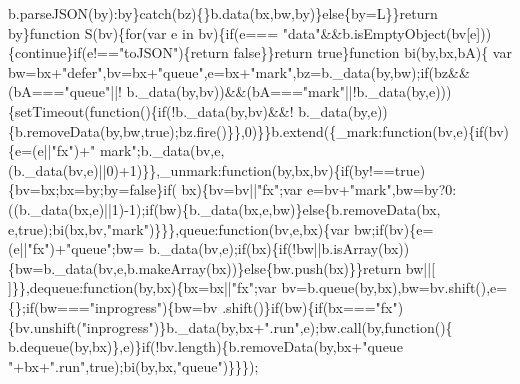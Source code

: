 \begin{DoxyCode}
      b.parseJSON(by):by\}catch(bz)\{\}b.data(bx,bw,by)\}\textcolor{keywordflow}{else}\{by=L\}\}\textcolor{keywordflow}{return} by\}\textcolor{keyword}{function} S(bv)\{\textcolor{keywordflow}{for}(var e in bv)\{\textcolor{keywordflow}{if}(e===\textcolor{stringliteral}{
      "data"}&&b.isEmptyObject(bv[e]))\{\textcolor{keywordflow}{continue}\}\textcolor{keywordflow}{if}(e!==\textcolor{stringliteral}{"toJSON"})\{\textcolor{keywordflow}{return} \textcolor{keyword}{false}\}\}\textcolor{keywordflow}{return} \textcolor{keyword}{true}\}\textcolor{keyword}{function} bi(by,bx,bA)\{
      var bw=bx+\textcolor{stringliteral}{"defer"},bv=bx+\textcolor{stringliteral}{"queue"},e=bx+\textcolor{stringliteral}{"mark"},bz=b.\_data(by,bw);\textcolor{keywordflow}{if}(bz&&(bA===\textcolor{stringliteral}{"queue"}||!
      b.\_data(by,bv))&&(bA===\textcolor{stringliteral}{"mark"}||!b.\_data(by,e)))\{setTimeout(\textcolor{keyword}{function}()\{\textcolor{keywordflow}{if}(!b.\_data(by,bv)&&!
      b.\_data(by,e))\{b.removeData(by,bw,\textcolor{keyword}{true});bz.fire()\}\},0)\}\}b.extend(\{\_mark:function(bv,e)\{if(bv)\{e=(e||\textcolor{stringliteral}{"fx"})+\textcolor{stringliteral}{"
      mark"};b.\_data(bv,e,(b.\_data(bv,e)||0)+1)\}\},\_unmark:\textcolor{keyword}{function}(by,bx,bv)\{if(by!==true)\{bv=bx;bx=by;by=false\}\textcolor{keywordflow}{if}(
      bx)\{bv=bv||\textcolor{stringliteral}{"fx"};var e=bv+\textcolor{stringliteral}{"mark"},bw=by?0:((b.\_data(bx,e)||1)-1);if(bw)\{b.\_data(bx,e,bw)\}\textcolor{keywordflow}{else}\{b.removeData(bx,
      e,true);bi(bx,bv,\textcolor{stringliteral}{"mark"})\}\}\},queue:\textcolor{keyword}{function}(bv,e,bx)\{var bw;\textcolor{keywordflow}{if}(bv)\{e=(e||\textcolor{stringliteral}{"fx"})+\textcolor{stringliteral}{"queue"};bw=
      b.\_data(bv,e);\textcolor{keywordflow}{if}(bx)\{\textcolor{keywordflow}{if}(!bw||b.isArray(bx))\{bw=b.\_data(bv,e,b.makeArray(bx))\}\textcolor{keywordflow}{else}\{bw.push(bx)\}\}\textcolor{keywordflow}{return} bw||[
      ]\}\},dequeue:\textcolor{keyword}{function}(by,bx)\{bx=bx||\textcolor{stringliteral}{"fx"};var bv=b.queue(by,bx),bw=bv.shift(),e=\{\};\textcolor{keywordflow}{if}(bw===\textcolor{stringliteral}{"inprogress"})\{bw=bv
      .shift()\}\textcolor{keywordflow}{if}(bw)\{\textcolor{keywordflow}{if}(bx===\textcolor{stringliteral}{"fx"})\{bv.unshift(\textcolor{stringliteral}{"inprogress"})\}b.\_data(by,bx+\textcolor{stringliteral}{".run"},e);bw.call(by,\textcolor{keyword}{function}()\{
      b.dequeue(by,bx)\},e)\}\textcolor{keywordflow}{if}(!bv.length)\{b.removeData(by,bx+\textcolor{stringliteral}{"queue "}+bx+\textcolor{stringliteral}{".run"},\textcolor{keyword}{true});bi(by,bx,\textcolor{stringliteral}{"queue"})\}\}\});

\end{DoxyCode}
